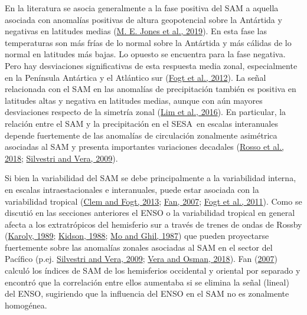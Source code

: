\documentclass[12pt,oneside,a4paper]{reedthesis}
\begin{document}
En la literatura se asocia generalmente a la fase positiva del SAM a aquella asociada con anomalías positivas de altura geopotencial sobre la Antártida y negativas en latitudes medias (\protect\hyperlink{ref-jones2019}{M. E. Jones et al., 2019}).
En esta fase las temperaturas son más frías de lo normal sobre la Antártida y más cálidas de lo normal en latitudes más bajas.
Lo opuesto se encuentra para la fase negativa.
Pero hay desviaciones significativas de esta respuesta media zonal, especialmente en la Península Antártica y el Atlántico sur (\protect\hyperlink{ref-fogt2012}{Fogt et al., 2012}).
La señal relacionada con el SAM en las anomalías de precipitación también es positiva en latitudes altas y negativa en latitudes medias, aunque con aún mayores desviaciones respecto de la simetría zonal (\protect\hyperlink{ref-lim2016}{Lim et al., 2016}).
En particular, la relación entre el SAM y la precipitación en el SESA~en escalas interanuales depende fuertemente de las anomalías de circulación zonalmente asimétrica asociadas al SAM y presenta importantes variaciones decadales (\protect\hyperlink{ref-rosso2018}{Rosso et al., 2018}; \protect\hyperlink{ref-silvestri2009}{Silvestri and Vera, 2009}).

Si bien la variabilidad del SAM se debe principalmente a la variabilidad interna, en escalas intraestacionales e interanuales, puede estar asociada con la variabilidad tropical (\protect\hyperlink{ref-clem2013}{Clem and Fogt, 2013}; \protect\hyperlink{ref-fan2007}{Fan, 2007}; \protect\hyperlink{ref-fogt2011a}{Fogt et al., 2011}).
Como se discutió en las secciones anteriores el ENSO o la variabilidad tropical en general afecta a los extratrópicos del hemisferio sur a través de trenes de ondas de Rossby (\protect\hyperlink{ref-karoly1989}{Karoly, 1989}; \protect\hyperlink{ref-kidson1988}{Kidson, 1988}; \protect\hyperlink{ref-mo1987}{Mo and Ghil, 1987}) que pueden proyectarse fuertemente sobre las anomalías zonales asociadas al SAM en el sector del Pacífico (p.ej. \protect\hyperlink{ref-silvestri2009}{Silvestri and Vera, 2009}; \protect\hyperlink{ref-vera2018}{Vera and Osman, 2018}).
Fan (\protect\hyperlink{ref-fan2007}{2007}) calculó los índices de SAM de los hemisferios occidental y oriental por separado y encontró que la correlación entre ellos aumentaba si se elimina la señal (lineal) del ENSO, sugiriendo que la influencia del ENSO en el SAM no es zonalmente homogénea.
\end{document}
